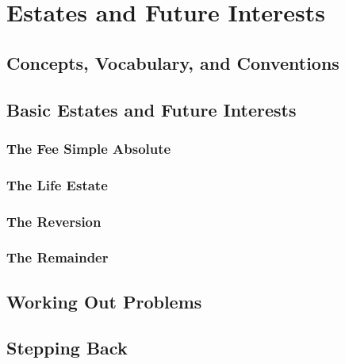 \chapter{Estates and Future Interests}





\section{Concepts, Vocabulary, and Conventions}






\section{Basic Estates and Future Interests}



\subsection{The Fee Simple Absolute}




\subsection{The Life Estate}




\subsection{The Reversion}




\subsection{The Remainder}




\begin{questions}

\end{questions}

\section{Working Out Problems}




\section{Stepping Back}


